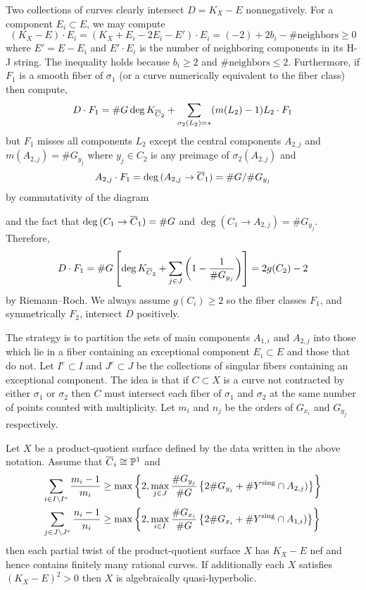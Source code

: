 \documentclass[main.tex]{subfiles}
\begin{document}
Two collections of curves clearly intersect $D = K_X - E$ nonnegatively. For a component $E_i \subset E$, we may compute
\[ (K_X - E) \cdot E_i = (K_X + E_i - 2 E_i - E') \cdot E_i = (-2) + 2 b_i - \# \text{neighbors} \ge 0 \]
where $E' = E - E_i$ and $E' \cdot E_i$ is the number of neighboring components in its H-J string. The inequality holds because $b_i \ge 2$ and $\# \text{neighbors} \le 2$. Furthermore, if $F_1$ is a smooth fiber of $\sigma_1$ (or a curve numerically equivalent to the fiber class) then compute,
\[ D \cdot F_1 = \# G \deg{K_{\overline{C}_{2}}} + \sum_{\sigma_{2}(L_2) = *} (m(L_2) - 1) L_2 \cdot F_1 \]
but $F_1$ misses all components $L_2$ except the central components $A_{2,j}$ and $m(A_{2,j}) = \# G_{y_j}$ where $y_j \in C_2$ is any preimage of $\sigma_2(A_{2,j})$ and 
\[ A_{2,j} \cdot F_1 = \deg{(A_{2,j} \to \overline{C}_1)} = \# G / \# G_{y_j} \] 
by commutativity of the diagram
\begin{center}
\end{center}
and the fact that $\deg{(C_1 \to \overline{C}_1)} = \# G$ and $\deg{(C_1 \to A_{2,j})} = \# G_{y_j}$. Therefore,
\[ D \cdot F_1 = \# G \left[ \deg{K_{\overline{C}_{2}}} + \sum_{j \in J} \left( 1 - \frac{1}{\# G_{y_j}} \right) \right] = 2 g(C_2) - 2 \]
by Riemann--Roch. We always assume $g(C_i) \ge 2$ so the fiber classes $F_1$, and symmetrically $F_2$, intersect $D$ positively. 
\par 
The strategy is to partition the sets of main components $A_{1,i}$ and $A_{2,j}$ into those which lie in a fiber containing an exceptional component $E_i \subset E$ and those that do not. Let $I^e \subset I$ and $J^e \subset J$ be the collections of singular fibers containing an exceptional component. The idea is that if $C \subset X$ is a curve not contracted by either $\sigma_1$ or $\sigma_2$ then $C$ must intersect each fiber of $\sigma_1$ and $\sigma_2$ at the same number of points counted with multiplicity. Let $m_i$ and $n_j$ be the orders of $G_{x_i}$ and $G_{y_j}$ respectively. 

\begin{thm}
Let $X$ be a product-quotient surface defined by the data written in the above notation. Assume that $\overline{C}_i \cong \mathbb{P}^1$ and
\begin{align*}
\sum_{i \in I \setminus I^e} \frac{m_i - 1}{m_i} & \ge \max \left \{ 2, \max_{j \in J} \frac{\# G_{y_j}}{\# G} \left\{ 2 \# G_{y_j} + \# Y^{\mathrm{sing}} \cap A_{2,j}) \right\} \right \}
\\
\sum_{j \in J \setminus J^e} \frac{n_i - 1}{n_i} & \ge \max \left \{ 2, \max_{i \in I} \frac{\# G_{x_i}}{\# G} \left\{ 2 \# G_{x_i} + \# Y^{\mathrm{sing}} \cap A_{1,i}) \right\} \right \}
\end{align*}
then each partial twist of the product-quotient surface $X$ has $K_X - E$ nef and hence contains finitely many rational curves. If additionally each $X$ satisfies $(K_X - E)^2 > 0$ then $X$ is algebraically quasi-hyperbolic. 
\end{thm}
\end{document}
